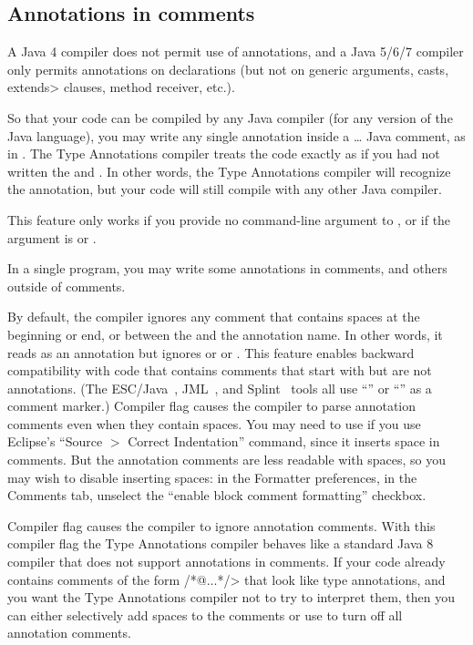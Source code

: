 \subsection{Annotations in comments\label{annotations-in-comments}}

A Java 4 compiler does not permit use of
annotations, and a Java 5/6/7 compiler only permits annotations on
declarations (but not on generic arguments, casts, \<extends> clauses, method receiver, etc.).

So that your code can be compiled by any Java compiler (for any version of
the Java language), you may write any single annotation inside a
\code{/*}\ldots\code{*/} Java comment, as in .
The Type Annotations compiler treats the code exactly as if you had not written the
\code{/*} and \code{*/}.
In other words, the Type Annotations compiler will recognize the
annotation, but your code will still compile with any other Java compiler.

This feature only works if you provide no  command-line
argument to , or if the  argument is 
or .

In a single program, you may write some annotations in comments, and others
outside of comments.

By default, the compiler ignores any comment that contains spaces at the
beginning or end, or between the  and the annotation name.
In other words, it reads  as an annotation but ignores
 or  or .
This
feature enables backward compatibility with code that contains comments
that start with  but are not annotations.  (The
ESC/Java~\cite{FlanaganLLNSS02}, JML~\cite{LeavensBR2006:JML}, and
Splint~\cite{Evans96} tools all use ``'' or ``'' as a
comment marker.)
Compiler flag
 causes the compiler to parse annotation comments
even when they contain spaces.  You may need to use
 if you use Eclipse's ``Source $>$ Correct
Indentation'' command, since it inserts space in comments.  But the
annotation comments are less readable with spaces, so you may wish to disable
inserting spaces:  in the Formatter preferences, in the Comments tab,
unselect the ``enable block comment formatting'' checkbox.

Compiler flag  causes the compiler
to ignore annotation comments.  With this compiler flag the Type
Annotations compiler behaves like a standard Java 8 compiler that does
not support annotations in comments.  If your code already contains
comments of the form \</*@...*/> that look like type annotations, and
you want the Type Annotations compiler not to try to interpret them,
then you can either selectively add spaces to the comments or use
 to turn off all annotation
comments.

